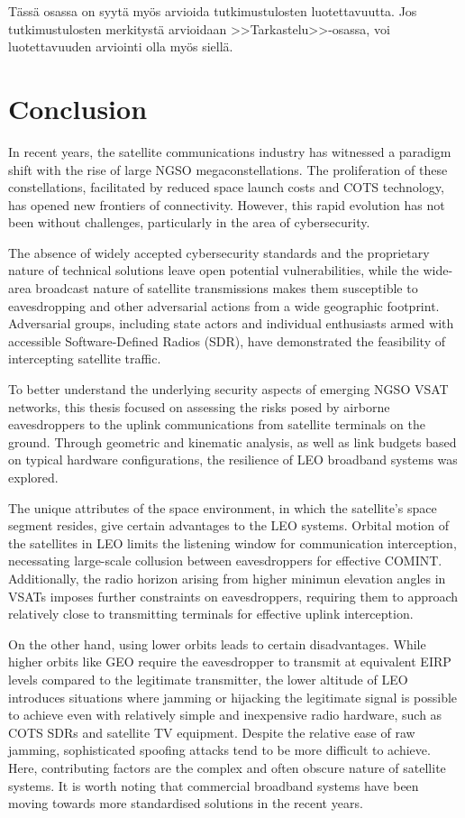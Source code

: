 \documentclass[english, 12pt, a4paper, elec, utf8, a-1b, online]{aaltothesis}
\begin{document}
T\"ass\"a osassa on syyt\"a my\"os arvioida tutkimustulosten luotettavuutta.
Jos tutkimustulosten merkityst\"a arvioidaan >>Tarkastelu>>-osassa,
voi luotettavuuden arviointi olla my\"os siell\"a.

\clearpage

\section{Conclusion}

In recent years, the satellite communications industry has witnessed a paradigm shift with the rise of large NGSO megaconstellations.
The proliferation of these constellations, facilitated by reduced space launch costs and COTS technology, has opened new frontiers of connectivity.
However, this rapid evolution has not been without challenges, particularly in the area of cybersecurity.

The absence of widely accepted cybersecurity standards and the proprietary nature of technical solutions leave open potential vulnerabilities, while the wide-area broadcast nature of satellite transmissions makes them susceptible to eavesdropping and other adversarial actions from a wide geographic footprint. Adversarial groups, including state actors and individual enthusiasts armed with accessible Software-Defined Radios (SDR), have demonstrated the feasibility of intercepting satellite traffic.

To better understand the underlying security aspects of emerging NGSO VSAT networks, this thesis focused on assessing the risks posed by airborne eavesdroppers to the uplink communications from satellite terminals on the ground. Through geometric and kinematic analysis, as well as link budgets based on typical hardware configurations, the resilience of LEO broadband systems was explored.

The unique attributes of the space environment, in which the satellite's space segment resides, give certain advantages to the LEO systems. Orbital motion of the satellites in LEO limits the listening window for communication interception, necessating large-scale collusion between eavesdroppers for effective COMINT. Additionally, the radio horizon  arising from higher minimun elevation angles in VSATs imposes further constraints on eavesdroppers, requiring them to approach relatively close to transmitting terminals for effective uplink interception.

On the other hand, using lower orbits leads to certain disadvantages. While higher orbits like GEO require the eavesdropper to transmit at equivalent EIRP levels compared to the legitimate transmitter, the lower altitude of LEO introduces situations where jamming or hijacking the legitimate signal is possible to achieve even with relatively simple and inexpensive radio hardware, such as COTS SDRs and satellite TV equipment. Despite the relative ease of raw jamming, sophisticated spoofing attacks tend to be more difficult to achieve. Here, contributing factors are the complex and often obscure nature of satellite systems. It is worth noting that commercial broadband systems have been moving towards more standardised solutions in the recent years. 
\end{document}
